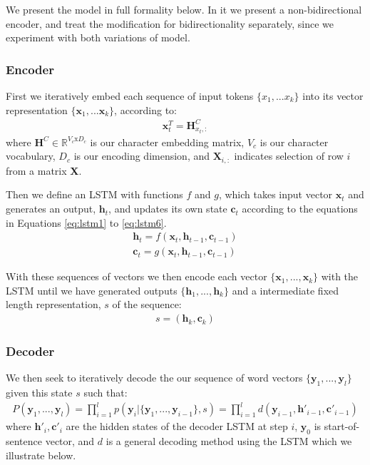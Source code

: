 We present the model in full formality below. In it we present a non-bidirectional encoder, and treat the modification for bidirectionality separately, since we experiment with both variations of model.

\subsubsection{Encoder}

First we iteratively embed each sequence of input tokens $\{x_1,...x_k\}$ into its vector representation $\{\textbf{x}_1,...\textbf{x}_k\}$, according to:
\begin{align}
    \textbf{x}^T_t = \mathbf{H}^C_{x_t,:}
\end{align}
where 
$\textbf{H}^C \in \mathbb{R}^{V_c\text{x}D_c}$ is our character embedding matrix, 
$V_c$ is our character vocabulary, 
$D_c$ is our encoding dimension, 
and $\textbf{X}_{i,:}$ indicates selection of row $i$ from a matrix \textbf{X}.

Then we define an LSTM with functions $f$ and $g$, which takes input vector $\textbf{x}_t$ and generates an output, $\textbf{h}_t$, and updates its own state $\textbf{c}_t$ according to the equations in Equations \ref{eq:lstm1} to \ref{eq:lstm6}.
\begin{align}
    \textbf{h}_t = f(\textbf{x}_t, \textbf{h}_{t-1}, \textbf{c}_{t-1}) \label{eq:s2sh}\\
    \textbf{c}_t = g(\textbf{x}_t, \textbf{h}_{t-1}, \textbf{c}_{t-1}) \label{eq:s2sc}
\end{align}

With these sequences of vectors we then encode each vector $\{\textbf{x}_1,...,\textbf{x}_k\}$ with the LSTM until we have generated outputs $\{\textbf{h}_1,...,\textbf{h}_k\}$ and a intermediate fixed length representation, $s$ of the sequence: 
\begin{align}
     s = (\textbf{h}_k, \textbf{c}_k) \label{eq:s2s_state}
\end{align}

\subsubsection{Decoder}

We then seek to iteratively decode the our sequence of word vectors $\{\textbf{y}_1,..., \textbf{y}_l\}$ given this state $s$ such that:
\begin{align}
    P(\textbf{y}_1,...,\textbf{y}_l) = \prod_{i=1}^l p(\textbf{y}_i| \{\textbf{y}_1,...,\textbf{y}_{i-1}\}, s)  = \prod_{i=1}^ld(\mathbf{y}_{i-1}, \mathbf{h}'_{i-1},\mathbf{c}'_{i-1} )
\end{align}
where $\mathbf{h}'_{i},\mathbf{c}'_{i} $ are the hidden states of the decoder LSTM at step $i$, $\mathbf{y}_0$ is start-of-sentence vector, and $d$ is a general decoding method using the LSTM which we illustrate below.

